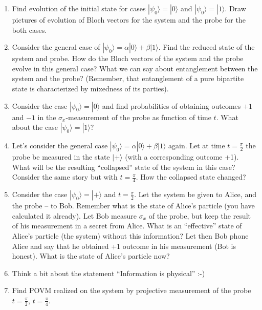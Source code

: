 \documentclass[a4paper,10pt]{article}
\newcommand{\ket}[1]{|#1\rangle}
\begin{document}
\begin{enumerate}
	\item Find evolution of the initial state for cases $\ket{\psi_{0}}=\ket{0}$ and $\ket{\psi_{0}}=\ket{1}$.
	Draw pictures of evolution of Bloch vectors for the system and the probe for the both cases.
	\item Consider the general case of $\ket{\psi_{0}}=\alpha\ket{0}+\beta\ket{1}$. Find the reduced state of the system and probe.
	How do the Bloch vectors of the system and the probe evolve in this general case?
	What we can say about entanglement between the system and the probe? (Remember, that entanglement of a pure bipartite state is characterized by mixedness of its parties).
	\item Consider the case $\ket{\psi_{0}}=\ket{0}$ and find probabilities of obtaining outcomes $+1$ and $-1$ in the $\sigma_{x}$-measurement of the probe as function of time $t$.
	What about the case $\ket{\psi_{0}}=\ket{1}$?
	\item Let's consider the general case $\ket{\psi_{0}}=\alpha\ket{0}+\beta\ket{1}$ again. Let at time $t=\frac{\pi}{2}$ the probe be measured in the state $\ket{+}$ (with a corresponding outcome +1). What will be the resulting ``collapsed'' state of the system in this case? Consider the same story but with $t=\frac{\pi}{4}$. How the collapsed state changed?
	\item Consider the case $\ket{\psi_{0}}=\ket{+}$ and $t=\frac{\pi}{2}$. Let the system be given to Alice, and the probe -- to Bob. Remember what is the state of Alice's particle (you have calculated it already).
	Let Bob measure $\sigma_{x}$ of the probe, but keep the result of his measurement in a secret from Alice.
	What is an ``effective'' state of Alice's particle (the system) without this information?
	Let then Bob phone Alice and say that he obtained +1 outcome in his measurement (Bot is honest). 
	What is the state of Alice's particle now?
	\item Think a bit about the statement ``Information is physical'' :-)
	\item Find POVM realized on the system by projective measurement of the probe $t=\frac{\pi}{2}$, $t=\frac{\pi}{4}$.
\end{enumerate}
\end{document}

